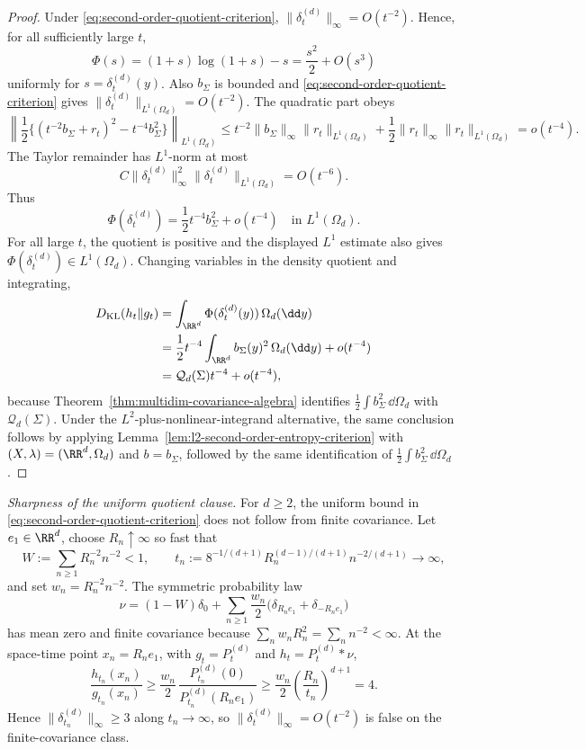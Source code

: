 \begin{proof}
Under \eqref{eq:second-order-quotient-criterion},
\(\|\delta_t^{(d)}\|_\infty=O(t^{-2})\).  Hence, for all sufficiently large
\(t\),
\[
\Phi(s)=(1+s)\log(1+s)-s=\frac{s^2}{2}+O(s^3)
\]
uniformly for \(s=\delta_t^{(d)}(y)\).  Also \(b_\Sigma\) is bounded and
\eqref{eq:second-order-quotient-criterion} gives
\(\|\delta_t^{(d)}\|_{L^1(\Omega_d)}=O(t^{-2})\).  The quadratic part obeys
\[
\left\|\frac12\{(t^{-2}b_\Sigma+r_t)^2-t^{-4}b_\Sigma^2\}\right\|_{L^1(\Omega_d)}
\le
t^{-2}\|b_\Sigma\|_\infty\|r_t\|_{L^1(\Omega_d)}
+\frac12\|r_t\|_\infty\|r_t\|_{L^1(\Omega_d)}
=o(t^{-4}).
\]
The Taylor remainder has \(L^1\)-norm at most
\[
C\|\delta_t^{(d)}\|_\infty^2\|\delta_t^{(d)}\|_{L^1(\Omega_d)}=O(t^{-6}).
\]
Thus
\[
\Phi(\delta_t^{(d)})=\frac12t^{-4}b_\Sigma^2+o(t^{-4})
\quad\text{in }L^1(\Omega_d).
\]
For all large \(t\), the quotient is positive and the displayed \(L^1\)
estimate also gives \(\Phi(\delta_t^{(d)})\in L^1(\Omega_d)\).  Changing
variables in the density quotient and integrating,
\[
\begin{aligned}
D_{\rm KL}(h_t\|g_t)
&=\int_{\RR^d}\Phi(\delta_t^{(d)}(y))\,\Omega_d(\dd y)\\
&=\frac12t^{-4}\int_{\RR^d}b_\Sigma(y)^2\,\Omega_d(\dd y)+o(t^{-4})\\
&=\mathcal Q_d(\Sigma)t^{-4}+o(t^{-4}),
\end{aligned}
\]
because Theorem~\ref{thm:multidim-covariance-algebra} identifies
\(\frac12\int b_\Sigma^2\,\dd\Omega_d\) with \(\mathcal Q_d(\Sigma)\).
Under the \(L^2\)-plus-nonlinear-integrand alternative, the same conclusion follows
by applying Lemma~\ref{lem:l2-second-order-entropy-criterion} with
\((X,\lambda)=(\RR^d,\Omega_d)\) and \(b=b_\Sigma\), followed by the same
identification of \(\frac12\int b_\Sigma^2\,\dd\Omega_d\).
\end{proof}

\noindent\emph{Sharpness of the uniform quotient clause.}
For \(d\ge2\), the uniform bound in
\eqref{eq:second-order-quotient-criterion} does not follow from finite
covariance.  Let \(e_1\in\RR^d\), choose
\(R_n\uparrow\infty\) so fast that
\[
  W:=\sum_{n\ge1}R_n^{-2}n^{-2}<1,\qquad
  t_n:=8^{-1/(d+1)}R_n^{(d-1)/(d+1)}n^{-2/(d+1)}\to\infty,
\]
and set \(w_n=R_n^{-2}n^{-2}\).  The symmetric probability law
\[
  \nu=(1-W)\delta_0
  +\sum_{n\ge1}\frac{w_n}{2}
  \bigl(\delta_{R_ne_1}+\delta_{-R_ne_1}\bigr)
\]
has mean zero and finite covariance because
\(\sum_n w_nR_n^2=\sum_n n^{-2}<\infty\).  At the space-time point
\(x_n=R_ne_1\), with \(g_t=P_t^{(d)}\) and \(h_t=P_t^{(d)}*\nu\),
\[
\frac{h_{t_n}(x_n)}{g_{t_n}(x_n)}
\ge
\frac{w_n}{2}\,
\frac{P_{t_n}^{(d)}(0)}{P_{t_n}^{(d)}(R_ne_1)}
\ge
\frac{w_n}{2}\left(\frac{R_n}{t_n}\right)^{d+1}
=4 .
\]
Hence \(\|\delta_{t_n}^{(d)}\|_\infty\ge3\) along \(t_n\to\infty\), so
\(\|\delta_t^{(d)}\|_\infty=O(t^{-2})\) is false on the finite-covariance
class.

